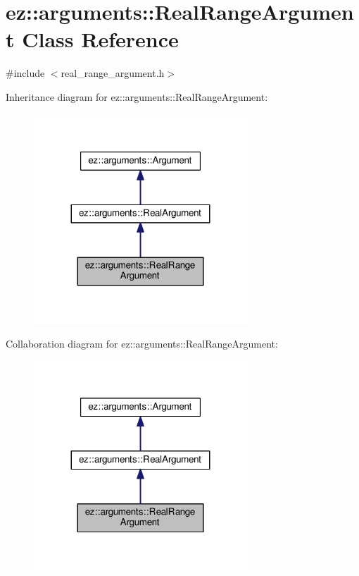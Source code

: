 \hypertarget{classez_1_1arguments_1_1RealRangeArgument}{}\section{ez\+:\+:arguments\+:\+:Real\+Range\+Argument Class Reference}
\label{classez_1_1arguments_1_1RealRangeArgument}


{\ttfamily \#include $<$real\+\_\+range\+\_\+argument.\+h$>$}



Inheritance diagram for ez\+:\+:arguments\+:\+:Real\+Range\+Argument\+:
\nopagebreak
\begin{figure}[H]
\begin{center}
\leavevmode
\includegraphics[width=227pt]{classez_1_1arguments_1_1RealRangeArgument__inherit__graph}
\end{center}
\end{figure}


Collaboration diagram for ez\+:\+:arguments\+:\+:Real\+Range\+Argument\+:
\nopagebreak
\begin{figure}[H]
\begin{center}
\leavevmode
\includegraphics[width=227pt]{classez_1_1arguments_1_1RealRangeArgument__coll__graph}
\end{center}
\end{figure}
